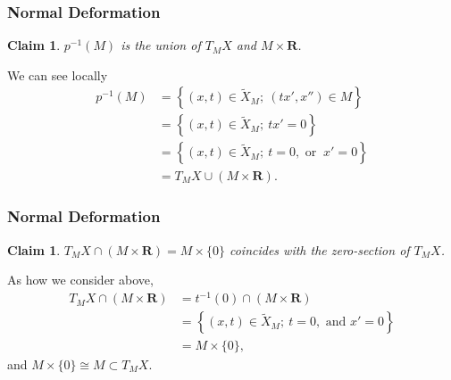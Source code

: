 \documentclass[dvipdfmx,12pt,aspectratio=169,leqno]{beamer}%
\makeatletter
\newcommand{\rr}{\mathbf{R}}
\renewenvironment{proof}[1][\proofname]{\par
  \pushQED{\qed}%
  \normalfont \topsep6\p@\@plus6\p@\relax
  \trivlist
  \item[\hskip\labelsep
         \bfseries
    {#1}]\ignorespaces
}{%
  \popQED\endtrivlist\@endpefalse
}
\renewcommand{\proofname}{\textrm{Proof.}}
\numberwithin{equation}{subsection}
\theoremstyle{mystyle}
\newtheorem{CLM}[AXM]{Claim}
\makeatother
\begin{document}
\begin{frame}
    \frametitle{Normal Deformation}
    \begin{CLM}
        \(p^{-1}(M)\) is the union of \(T_{M}X\) 
        and \(M\times \rr\).
    \end{CLM}
    \begin{proof}
        We can see locally
        \begin{align*}
            p^{-1}(M)
            &=\left\{(x,t)\in\widetilde{X}_{M};~(tx',x'')\in M\right\}\\
            &=\left\{(x,t)\in\widetilde{X}_{M};~tx'=0\right\}\\
            &=\left\{(x,t)\in\widetilde{X}_{M};~t=0,\text{ or }~x'=0\right\}\\
            &=T_{M}X\cup (M\times \rr).
        \end{align*}
    \end{proof}
\end{frame}

\begin{frame}
    \frametitle{Normal Deformation}
    \begin{CLM}
        \(T_{M}X\cap (M\times \rr)=M\times\{0\}\) coincides 
        with the zero-section of \(T_{M}X\).
    \end{CLM}
    \begin{proof}
        As how we consider above,
        \begin{align*}
            T_{M}X\cap (M\times \rr)
            &=t^{-1}(0)\cap (M\times \rr)\\
            &=\left\{(x,t)\in\widetilde{X}_{M};~t=0,\text{ and }x'=0\right\}\\
            &=M\times\{0\},
        \end{align*}
        and \(
            M\times\{0\}\cong M \subset T_{M}X.
        \)
    \end{proof}
\end{frame}
\end{document}
